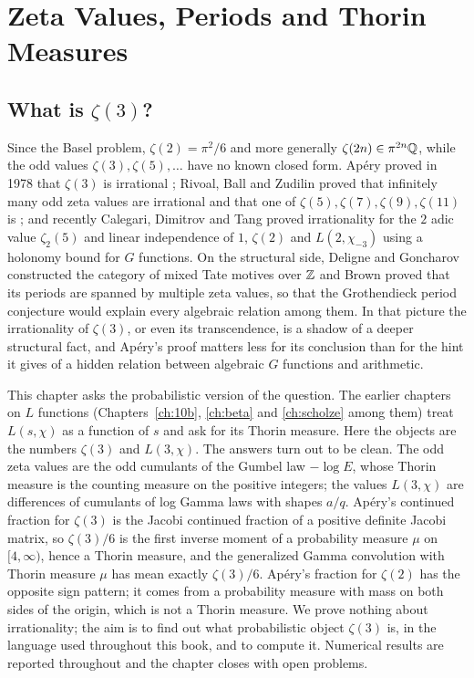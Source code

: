 \chapter{Zeta Values, Periods and Thorin Measures}\label{ch:zeta}

\section{What is $\zeta(3)$?}

Since the Basel problem, $\zeta(2)=\pi^2/6$ and more generally $\zeta(2n)\in\pi^{2n}\mathbb{Q}$, while the odd values $\zeta(3),\zeta(5),\dots$ have no known closed form. Ap\'ery proved in 1978 that $\zeta(3)$ is irrational \cite{apery1979}; Rivoal, Ball and Zudilin proved that infinitely many odd zeta values are irrational and that one of $\zeta(5),\zeta(7),\zeta(9),\zeta(11)$ is \cite{rivoal2000,ballrivoal2001,zudilin2001}; and recently Calegari, Dimitrov and Tang proved irrationality for the $2$ adic value $\zeta_2(5)$ \cite{calegaridimitrovtang2025,laisprangzudilin2025} and linear independence of $1$, $\zeta(2)$ and $L(2,\chi_{-3})$ \cite{calegaridimitrovtang2024} using a holonomy bound for $G$ functions. On the structural side, Deligne and Goncharov \cite{delignegoncharov2005} constructed the category of mixed Tate motives over $\mathbb{Z}$ and Brown \cite{brown2012} proved that its periods are spanned by multiple zeta values, so that the Grothendieck period conjecture would explain every algebraic relation among them. In that picture the irrationality of $\zeta(3)$, or even its transcendence, is a shadow of a deeper structural fact, and Ap\'ery's proof matters less for its conclusion than for the hint it gives of a hidden relation between algebraic $G$ functions and arithmetic.

This chapter asks the probabilistic version of the question. The earlier chapters on $L$ functions (Chapters~\ref{ch:10b}, \ref{ch:beta} and \ref{ch:scholze} among them) treat $L(s,\chi)$ as a function of $s$ and ask for its Thorin measure. Here the objects are the numbers $\zeta(3)$ and $L(3,\chi)$. The answers turn out to be clean. The odd zeta values are the odd cumulants of the Gumbel law $-\log E$, whose Thorin measure is the counting measure on the positive integers; the values $L(3,\chi)$ are differences of cumulants of log Gamma laws with shapes $a/q$. Ap\'ery's continued fraction for $\zeta(3)$ is the Jacobi continued fraction of a positive definite Jacobi matrix, so $\zeta(3)/6$ is the first inverse moment of a probability measure $\mu$ on $[4,\infty)$, hence a Thorin measure, and the generalized Gamma convolution with Thorin measure $\mu$ has mean exactly $\zeta(3)/6$. Ap\'ery's fraction for $\zeta(2)$ has the opposite sign pattern; it comes from a probability measure with mass on both sides of the origin, which is not a Thorin measure. We prove nothing about irrationality; the aim is to find out what probabilistic object $\zeta(3)$ is, in the language used throughout this book, and to compute it. Numerical results are reported throughout and the chapter closes with open problems.

